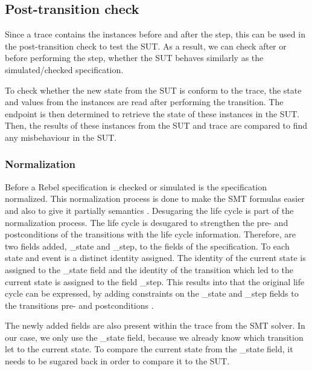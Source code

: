 \subsection{Post-transition check}

Since a trace contains the instances before and after the step, this can be used
in the post-transition check to test the SUT. As a result, we can check after or
before performing the step, whether the SUT behaves similarly as the
simulated/checked specification.

To check whether the new state from the SUT is
conform to the trace, the state and values from the instances are read after
performing the transition. The endpoint is then determined to retrieve the state
of these instances in the SUT. Then, the results of these instances from the SUT
and trace are compared to find any misbehaviour in the SUT.

\subsubsection{Normalization}

Before a Rebel specification is checked or simulated is the specification
normalized. This normalization process is done to make the SMT formulas easier
and also to give it partially semantics
\cite[p.5]{stoel_storm_vinju_bosman_2016}. Desugaring the life cycle is part of
the normalization process. The life cycle is desugared to strengthen the pre-
and postconditions of the transitions with the life cycle information.
Therefore, are two fields added, \_state and \_step, to the fields of the
specification. To each state and event is a distinct identity assigned. The
identity of the current state is assigned to the \_state field and the identity
of the transition which led to the current state is assigned to the field
\_step. This results into that the original life cycle can be expressed, by
adding constraints on the \_state and \_step fields to the transitions pre- and
postconditions \cite[p.5]{stoel_storm_vinju_bosman_2016}.

The newly added fields
are also present within the trace from the SMT solver. In our case, we only use
the \_state field, because we already know which transition let to the current
state. To compare the current state from the \_state field, it needs to be
sugared back in order to compare it to the SUT.

